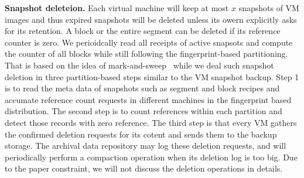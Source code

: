 {\bf Snapshot deleteion.} Each virtual machine will keep at most $x$ snapshots of VM images and thus
expired snapshots will be deleted unless its owern explicitly asks for its retention. 
A block or the entire segment can be deleted if its reference counter is zero.
We perioidcally read all receipts of active 
snapsots and compute the counter of all blocks while still following the fingerprint-based partitioning.
That is based on the idea of mark-and-sweep~\cite{MarkSweep} while 
we deal such snapshot deletion in three partition-based steps similar to the VM snapshot backup.
Step 1 is to read  the meta data of snapshots such as segment and block
recipes and  accumate  reference count requests in different machines  in the fingerprint based distribution.
The second step  is to count references within each partition and detect those records with zero 
reference. The third step is that every VM gathers the confirmed deletion requests for its cotent and sends them
to the backup storage.
The archival data repository may log these deletion requests,  and will periodically perform a compaction operation when 
its deletion log is too big. 
Due to the paper constraint, we will not discuss the deletion operations in details.




